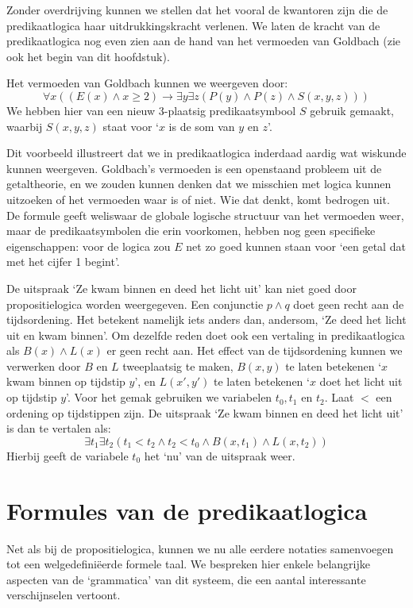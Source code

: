 Zonder overdrijving kunnen we stellen dat het vooral de kwantoren zijn die de predikaatlogica haar uitdrukkingskracht verlenen. We laten de kracht van de predikaatlogica nog even zien aan de hand van het vermoeden van Goldbach (zie ook het begin van dit hoofdstuk).

\begin{example}\label{vb:pred:goldbach:formeel}
Het vermoeden van Goldbach kunnen we weergeven door:
$$\forall x((E(x)\wedge x\geq 2)\rightarrow\exists y\exists z(P(y)\wedge P(z)\wedge S(x,y,z)))$$
We hebben hier van een nieuw 3-plaatsig predikaatsymbool $S$ gebruik gemaakt, waarbij $S(x,y,z)$ staat voor `$x$ is de som van $y$ en $z$'.
\end{example}
Dit voorbeeld illustreert dat we in predikaatlogica inderdaad aardig wat wiskunde kunnen weergeven. Goldbach's vermoeden is een openstaand probleem uit de getaltheorie, en we zouden kunnen denken dat we misschien met logica kunnen uitzoeken of het vermoeden waar is of niet. Wie dat denkt, komt bedrogen uit. De formule geeft weliswaar de globale logische structuur van het vermoeden weer, maar de predikaatsymbolen die erin voorkomen, hebben nog geen specifieke eigenschappen: voor de logica zou $E$ net zo goed kunnen staan voor `een getal dat met het cijfer 1 begint'.

\begin{example}
De uitspraak `Ze kwam binnen en deed het licht uit' kan niet goed door propositielogica worden weergegeven. Een conjunctie $p\wedge q$ doet geen recht aan de tijdsordening. Het betekent namelijk iets anders dan, andersom, `Ze deed het licht uit en kwam binnen'. Om dezelfde reden doet ook een vertaling in predikaatlogica als $B(x)\wedge L(x)$ er geen recht aan. Het effect van de tijdsordening kunnen we verwerken door $B$ en $L$ tweeplaatsig te maken, $B(x,y)$ te laten betekenen `$x$ kwam binnen op tijdstip $y$', en $L(x',y')$ te laten betekenen `$x$ doet het licht uit op tijdstip $y$'. Voor het gemak gebruiken we variabelen $t_0,t_1$ en $t_2$. Laat $<$ een ordening op tijdstippen zijn. De uitspraak `Ze kwam binnen en deed het licht uit' is dan te vertalen als:
$$\exists t_1\exists t_2 (t_1<t_2\wedge t_2<t_0\wedge B(x,t_1)\wedge L(x,t_2))$$
Hierbij geeft de variabele $t_0$ het `nu' van de uitspraak weer.
\end{example}

\section{Formules van de predikaatlogica}
Net als bij de propositielogica, kunnen we nu alle eerdere notaties samenvoegen tot een welgedefini\"eerde formele taal. We bespreken hier enkele belangrijke aspecten van de `grammatica' van dit systeem, die een aantal interessante verschijnselen vertoont.

